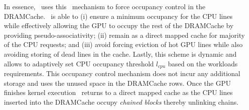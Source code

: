 \par In essence, \cachename\ uses this \chaining\ mechanism to force occupancy control in the DRAMCache. \chaining\ is able to 
(i) ensure a minimum occupancy for the CPU lines while effectively allowing the GPU to occupy the rest of the DRAMCache by providing pseudo-associativity;
(ii) remain as a direct mapped cache for majority of the CPU requests; and
(iii) avoid forcing eviction of hot GPU lines while also avoiding storing of dead lines in the cache.
Lastly, this scheme is dynamic and allows to adaptively set CPU occupancy threshold \textit{$l_{cpu}$} based on the workloads requirements. This occupancy control mechanism does not incur any additional storage and uses the unused space in the DRAMCache rows. Once the GPU finishes kernel execution \cachename\ returns to a direct mapped cache as the CPU lines inserted into the DRAMCache occupy \textit{chained blocks} thereby unlinking chains. 



